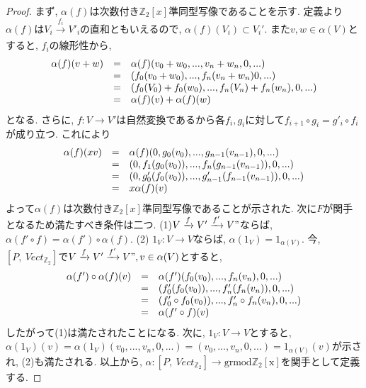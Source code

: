 \documentclass[a4paper]{jsarticle}
\theoremstyle{definition}
\newcommand{\Fun}[2]{[#1,~#2]}
\newcommand{\grmodZ}{{\mathrm{grmod \mathbb{Z}_2[x]}}}
\begin{document}
\begin{proof}
    まず, $\alpha(f)$は次数付き$\mathbb{Z}_2[x]$準同型写像であることを示す. 定義より$\alpha(f)$は$V_i\xrightarrow[]{f_i} V'_i$の直和ともいえるので, $\alpha(f)(V_i)\subset V_i'$. また$ v, w\in\alpha(V)$とすると, $f_i$の線形性から, 
\begin{equation}
    \begin{array}{lll}
      \alpha(f)(v+w)   &  =&\alpha(f)(v_0+w_0,...,v_n+w_n,0,...) \\
         &  =&(f_0(v_0+w_0),...,f_n(v_n+w_n)0,...)\\
         &  =&(f_0(V_0)+f_0(w_0),...,f_n(V_n)+f_n(w_n),0,...)\\
         &  =&\alpha(f)(v)+\alpha(f)(w)\notag
    \end{array}
\end{equation}
となる. さらに, $f:V\rightarrow V'$は自然変換であるから各$f_i, g_i$に対して$f_{i+1}\circ g_i=g'_i\circ f_{i}$が成り立つ. これにより
\begin{equation}
    \begin{array}{lll}
      \alpha(f)(xv)   &  =&\alpha(f)(0, g_0(v_0),..., g_{n-1}(v_{n-1}),0,...) \\
         &  =&(0, f_1(g_0(v_0)),..., f_n(g_{n-1}(v_{n-1})),0,...)\\
         &  =&(0, g'_0(f_0(v_0)),..., g'_{n-1}(f_{n-1}(v_{n-1})),0,...)\\
         &  =& x\alpha(f)(v) \notag
    \end{array}
\end{equation}
よって$\alpha(f)$は次数付き$\mathbb{Z}_2[x]$準同型写像であることが示された. 
次に$F$が関手となるため満たすべき条件は二つ. (1)$V\xrightarrow[]{f}V'\xrightarrow[]{f'}V"$ならば, $\alpha(f'\circ f) = \alpha(f')\circ \alpha(f)$. (2) $1_V:V\rightarrow V$ならば, $\alpha(1_V)=1_{\alpha(V)}$. 今, $\Fun{P}{Vect_{\mathbb{Z}_2}}$で$V\xrightarrow[]{f}V'\xrightarrow[]{f'}V", v\in\alpha(V)$とすると, 
\begin{equation}
    \begin{array}{lll}
      \alpha(f')\circ \alpha(f)(v)   &  =&\alpha(f')(f_0(v_0), ..., f_n(v_n),0,...) \\
         &  =&(f'_0(f_0(v_0)), ..., f'_n(f_n(v_n)),0,...)\\
         &  =&(f'_0\circ f_0(v_0)), ..., f'_n\circ f_n(v_n),0,...)\\
         &  =&\alpha(f'\circ f)(v)\notag
    \end{array}
\end{equation}
したがって(1)は満たされたことになる. 次に, $1_V:V\rightarrow V$とすると, $\alpha(1_V)(v)=\alpha(1_V)(v_0, ..., v_n,0,...)=(v_0, ..., v_n,0,...)=1_{\alpha(V)}(v)$が示され, (2)も満たされる. 以上から, $\alpha:\Fun{P}{Vect_{\mathbb{Z}_2}}\rightarrow \grmodZ$を関手として定義する.
\end{proof}
 
\end{document}
